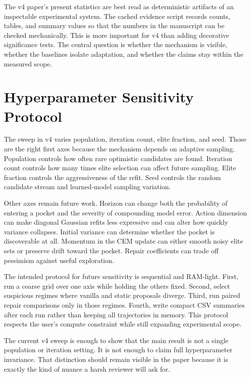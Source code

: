 The v4 paper's present statistics are best read as deterministic artifacts of
an inspectable experimental system. The cached evidence script records counts,
tables, and summary values so that the numbers in the manuscript can be
checked mechanically. This is more important for v4 than adding decorative
significance tests. The central question is whether the mechanism is visible,
whether the baselines isolate adaptation, and whether the claims stay within
the measured scope.

\section{Hyperparameter Sensitivity Protocol}
\label{app:sensitivity-protocol}

The sweep in v4 varies population, iteration count, elite fraction, and seed.
Those are the right first axes because the mechanism depends on adaptive
sampling. Population controls how often rare optimistic candidates are found.
Iteration count controls how many times elite selection can affect future
sampling. Elite fraction controls the aggressiveness of the refit. Seed
controls the random candidate stream and learned-model sampling variation.

Other axes remain future work. Horizon can change both the probability of
entering a pocket and the severity of compounding model error. Action
dimension can make diagonal Gaussian refits less expressive and can alter how
quickly variance collapses. Initial variance can determine whether the pocket
is discoverable at all. Momentum in the CEM update can either smooth noisy
elite sets or preserve drift toward the pocket. Repair coefficients can trade
off pessimism against useful exploration.

The intended protocol for future sensitivity is sequential and RAM-light.
First, run a coarse grid over one axis while holding the others fixed. Second,
select suspicious regimes where vanilla \cem{} and static proposals diverge.
Third, run paired repair comparisons only in those regimes. Fourth, write
compact CSV summaries after each run rather than keeping all trajectories in
memory. This protocol respects the user's compute constraint while still
expanding experimental scope.

The current v4 sweep is enough to show that the main result is not a single
population or iteration setting. It is not enough to claim full
hyperparameter invariance. That distinction should remain visible in the
paper because it is exactly the kind of nuance a harsh reviewer will ask for.

